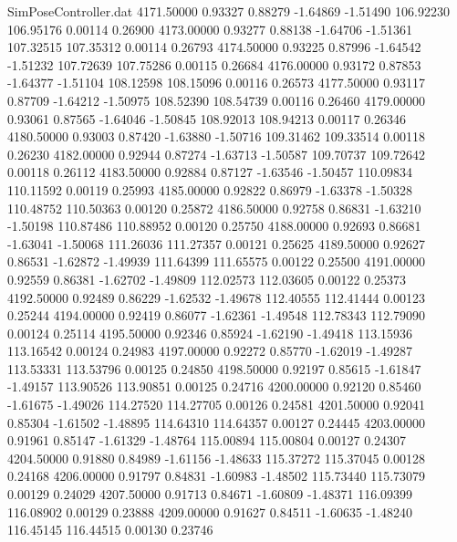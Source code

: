 \begin{filecontents}{SimPoseController.dat}
4171.50000    0.93327    0.88279    -1.64869   -1.51490  106.92230  106.95176    0.00114    0.26900
4173.00000    0.93277    0.88138    -1.64706   -1.51361  107.32515  107.35312    0.00114    0.26793
4174.50000    0.93225    0.87996    -1.64542   -1.51232  107.72639  107.75286    0.00115    0.26684
4176.00000    0.93172    0.87853    -1.64377   -1.51104  108.12598  108.15096    0.00116    0.26573
4177.50000    0.93117    0.87709    -1.64212   -1.50975  108.52390  108.54739    0.00116    0.26460
4179.00000    0.93061    0.87565    -1.64046   -1.50845  108.92013  108.94213    0.00117    0.26346
4180.50000    0.93003    0.87420    -1.63880   -1.50716  109.31462  109.33514    0.00118    0.26230
4182.00000    0.92944    0.87274    -1.63713   -1.50587  109.70737  109.72642    0.00118    0.26112
4183.50000    0.92884    0.87127    -1.63546   -1.50457  110.09834  110.11592    0.00119    0.25993
4185.00000    0.92822    0.86979    -1.63378   -1.50328  110.48752  110.50363    0.00120    0.25872
4186.50000    0.92758    0.86831    -1.63210   -1.50198  110.87486  110.88952    0.00120    0.25750
4188.00000    0.92693    0.86681    -1.63041   -1.50068  111.26036  111.27357    0.00121    0.25625
4189.50000    0.92627    0.86531    -1.62872   -1.49939  111.64399  111.65575    0.00122    0.25500
4191.00000    0.92559    0.86381    -1.62702   -1.49809  112.02573  112.03605    0.00122    0.25373
4192.50000    0.92489    0.86229    -1.62532   -1.49678  112.40555  112.41444    0.00123    0.25244
4194.00000    0.92419    0.86077    -1.62361   -1.49548  112.78343  112.79090    0.00124    0.25114
4195.50000    0.92346    0.85924    -1.62190   -1.49418  113.15936  113.16542    0.00124    0.24983
4197.00000    0.92272    0.85770    -1.62019   -1.49287  113.53331  113.53796    0.00125    0.24850
4198.50000    0.92197    0.85615    -1.61847   -1.49157  113.90526  113.90851    0.00125    0.24716
4200.00000    0.92120    0.85460    -1.61675   -1.49026  114.27520  114.27705    0.00126    0.24581
4201.50000    0.92041    0.85304    -1.61502   -1.48895  114.64310  114.64357    0.00127    0.24445
4203.00000    0.91961    0.85147    -1.61329   -1.48764  115.00894  115.00804    0.00127    0.24307
4204.50000    0.91880    0.84989    -1.61156   -1.48633  115.37272  115.37045    0.00128    0.24168
4206.00000    0.91797    0.84831    -1.60983   -1.48502  115.73440  115.73079    0.00129    0.24029
4207.50000    0.91713    0.84671    -1.60809   -1.48371  116.09399  116.08902    0.00129    0.23888
4209.00000    0.91627    0.84511    -1.60635   -1.48240  116.45145  116.44515    0.00130    0.23746

\end{filecontents}
